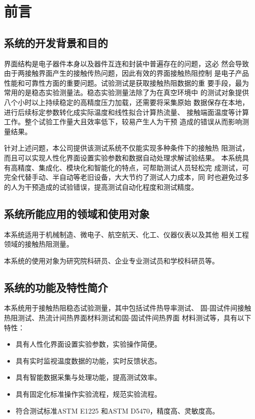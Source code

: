 \chapter{前言}
\section{系统的开发背景和目的}
\par 界面结构是电子器件本身以及器件互连和封装中普遍存在的问题，这必
然会导致由于两接触界面产生的接触传热问题，因此有效的界面接触热阻控制
是电子产品性能和可靠性方面的重要问题。试验测试是获取接触热阻数据的重
要手段，最为常用的是稳态实验测量法。稳态实验测量法除了为在真空环境中
的测试对象提供八个小时以上持续稳定的高精度压力加载，还需要将采集原始
数据保存在本地，进行后续标定参数转化成实际温度和线性拟合计算热流量、
接触端面温度等计算工作。整个试验工作量大且效率低下，较易产生人为干预
造成的错误从而影响测量结果。
\par 针对上述问题，本公司提供该测试系统不仅能实现多种条件下的接触热
阻测试，而且可以实现人性化界面设置实验参数和数据自动处理求解试验结果。
本系统具有高精度、集成化、模块化和智能化的特点，可帮助测试人员轻松完
成测试，可完全代替手动、半自动等老旧设备，大大节约了测试人力成本，同
时也避免过多的人为干预造成的试验错误，提高测试自动化程度和测试精度。

\section{系统所能应用的领域和使用对象}
\par 本系统适用于机械制造、微电子、航空航天、化工、仪器仪表以及其他
相关工程领域的接触热阻测量。
\par 本系统的使用对象为研究院科研员、企业专业测试员和学校科研员等。

\section{系统的功能及特性简介}
\par 本系统用于接触热阻稳态试验测量，其中包括试件热导率测试、
固-固试件间接触热阻测试、热流计间热界面材料测试和固-固试件间热界面
材料测试等，具有以下特性：
\begin{itemize}
    \item 具有人性化界面设置实验参数，实验操作简便。
    \item 具有实时监视温度数据的功能，实时反馈状态。
    \item 具有智能数据采集与处理功能，提高测试效率。
    \item 具有固定化标准操作实验流程，规范实验流程。
    \item 符合测试标准ASTM E1225 和ASTM D5470，精度高、灵敏度高。
\end{itemize}
